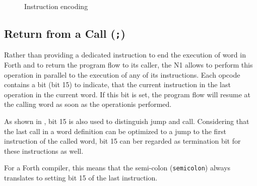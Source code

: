 \begin{figure}[!htb]
{{
    }
  }
  \caption{Instruction encoding}
  \label{opcodes:encoding}
\end{figure}

\subsection{Return from a Call (\texttt{;})}
\label{opcodes:rtc}

Rather than  providing a dedicated instruction to end the execution of 
word in Forth and to return the program flow to its caller, the N1 allows
to perform this operation in parallel to the execution of any of its
instructions. Each \gls{opcode} contains a bit (bit 15) to indicate, that the
current instruction in the last operation in the current word. If this bit
is set, the program flow will resume at the calling word as soon as the
operationis performed.

As shown in , bit 15 is also used to distinguish jump
and call. Considering that the last call in a word definition can be optimized
to a jump to the first instruction of the called word, bit 15 can ber regarded
as termination bit for these instructions as well.

For a Forth compiler, this means that the semi-colon (\texttt{\gls{semicolon}})
always translates to setting bit 15 of the last instruction.

